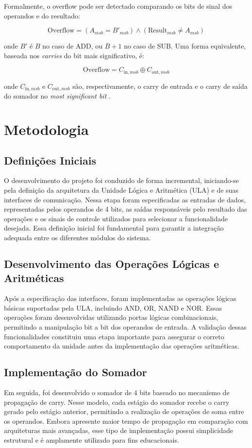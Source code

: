 \documentclass[a4paper,12pt]{article}
\begin{document}
Formalmente, o overflow pode ser detectado comparando os bits de sinal dos
operandos e do resultado:

\[
    \mathrm{Overflow} = (A_{msb} = B'_{msb}) \land (\mathrm{Result}_{msb} \neq A_{msb})
\]

onde $B'$ é $B$ no caso de ADD, ou $\overline{B}+1$ no caso de SUB. Uma forma
equivalente, baseada nos \textit{carries} do bit mais significativo, é:

\[
    \mathrm{Overflow} = C_{\mathrm{in},msb} \oplus C_{\mathrm{out},msb}
\]

onde $C_{\mathrm{in},msb}$ e $C_{\mathrm{out},msb}$ são, respectivamente, o carry de entrada e o carry de saída do somador no \textit{most significant bit} \cite{harris2021}.

\section{Metodologia}

\subsection{Definições Iniciais}
O desenvolvimento do projeto foi conduzido de forma incremental, iniciando-se pela definição da arquitetura da Unidade Lógica e Aritmética (ULA) e de suas interfaces de comunicação. Nessa etapa foram especificadas as entradas de dados, representadas pelos operandos de 4 bits, as saídas responsáveis pelo resultado das operações e os sinais de controle utilizados para selecionar a funcionalidade desejada. Essa definição inicial foi fundamental para garantir a integração adequada entre os diferentes módulos do sistema.

\subsection{Desenvolvimento das Operações Lógicas e Aritméticas}
Após a especificação das interfaces, foram implementadas as operações lógicas básicas suportadas pela ULA, incluindo AND, OR, NAND e NOR. Essas operações foram desenvolvidas utilizando portas lógicas combinacionais, permitindo a manipulação bit a bit dos operandos de entrada. A validação dessas funcionalidades constituiu uma etapa importante para assegurar o correto comportamento da unidade antes da implementação das operações aritméticas.

\subsection{Implementação do Somador}
Em seguida, foi desenvolvido o somador de 4 bits baseado no mecanismo de propagação de carry. Nesse modelo, cada estágio do somador recebe o carry gerado pelo estágio anterior, permitindo a realização de operações de soma entre os operandos. Embora apresente maior tempo de propagação em comparação com arquiteturas mais avançadas, esse tipo de implementação possui simplicidade estrutural e é amplamente utilizado para fins educacionais.
\end{document}
